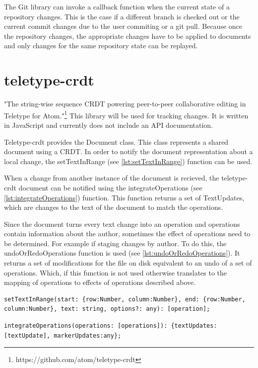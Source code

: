 The Git library can invoke a callback function when the current state of a repository changes. This is the case if a different branch is checked out or the current commit changes due to the user commiting or a git pull. Because once the repository changes, the appropriate changes have to be applied to documents and only changes for the same repository state can be replayed.

\section{teletype-crdt}
\label{sec:teletypecrdt}

"The string-wise sequence CRDT powering peer-to-peer collaborative editing in Teletype for Atom."\footnote{https://github.com/atom/teletype-crdt}
This library will be used for tracking changes. It is written in JavaScript and currently does not include an API documentation.


Teletype-crdt provides the Document class. This class represents a shared document using a CRDT. In order to notify the document representation about a local change, the setTextInRange (see \autoref{lst:setTextInRange}) function can be used.

When a change from another instance of the document is recieved, the teletype-crdt document can be notified using the integrateOperations (see \autoref{lst:integrateOperations}) function. This function returns a set of TextUpdates, which are changes to the text of the document to match the operations.

Since the document turns every text change into an operation and operations contain information about the author, sometimes the effect of operations need to be determined. For example if staging changes by author. To do this, the undoOrRedoOperations function is used (see \autoref{lst:undoOrRedoOperations}). It returns a set of modifications for the file on disk equivalent to an undo of a set of operations. Which, if this function is not used otherwise translates to the mapping of operations to effects of operations described above.


\begin{lstlisting}[label={lst:setTextInRange}, caption=teletype-crdt setTextInRange]
setTextInRange(start: {row:Number, column:Number}, end: {row:Number, column:Number}, text: string, options?: any): [operation];
\end{lstlisting}

\begin{lstlisting}[label={lst:integrateOperations}, caption=teletype-crdt integrateOperations]
integrateOperations(operations: [operations]): {textUpdates:[textUpdate], markerUpdates:any};
\end{lstlisting}


